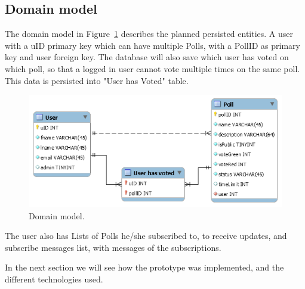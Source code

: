 \subsection{Domain model}
\label{sub:domainmodel}
The domain model in Figure~\ref{fig:domainmodel} describes the planned persisted entities. A user with a uID primary key which can have multiple Polls, with a PollID as primary key and user foreign key. The database will also save which user has voted on which poll, so that a logged in user cannot vote multiple times on the same poll. This data is persisted into "User has Voted" table.
\begin{figure}[H]
  \centering
  \includegraphics[scale=0.5]{figs/domainmodel.png}
  \caption[scale=0.5]{Domain model.}
  \label{fig:domainmodel}
\end{figure}

The user also has Lists of Polls he/she subscribed to, to receive updates, and subscribe messages list, with messages of the subscriptions.

\par\noindent In the next section we will see how the prototype was implemented, and the different technologies used.







% 

